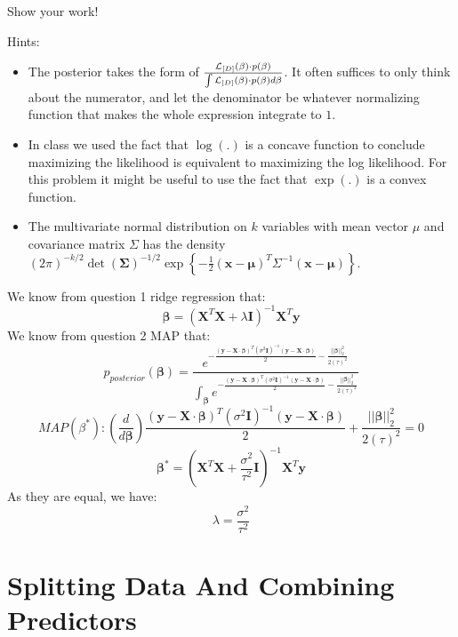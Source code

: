 \documentclass[11pt]{article}
\renewcommand{\vec}[1]{\mathbf{#1}}
\begin{document}
\begin{enumerate}
Show your work!

Hints:
\begin{itemize}
\item The posterior takes the form of
$\frac{
{\cal L}_{[D]}(\vec{\beta}) \cdot p(\vec{\beta})
}{
\int {\cal L}_{[D]}(\vec{\beta}) \cdot p(\vec{\beta})
d \vec{\beta}
}$.  It often suffices to only think about the numerator, and let the denominator be whatever normalizing function that makes the whole expression integrate to $1$.
\item In class we used the fact that $\log(.)$ is a concave function to conclude maximizing the likelihood is equivalent to maximizing the log likelihood.  For this problem it might be useful to use the fact that $\exp(.)$ is a convex function.
\item The multivariate normal distribution on $k$ variables with mean vector $\mu$ and covariance matrix $\Sigma$ has the density
$(2 \pi)^{-k/2} \det(\vec{\Sigma})^{-1/2}\exp \left\{ - \frac{1}{2} (\vec{x} - \vec{\mu})^T \Sigma^{-1} (\vec{x} - \vec{\mu})
 \right\}
$.
\end{itemize}

\begin{answertext}{10cm}{}
We know from question 1 ridge regression that:
$$\vec{\beta} = (\vec{X}^{T}\vec{X} + \lambda\vec{I})^{-1} \vec{X}^{T}\vec{y}$$
We know from question 2 MAP that:
$$p_{posterior}{(\vec{\beta})} = \frac{
e^{-\frac{(\vec y - \vec X \cdot \vec{\beta})^{T}(\sigma^2\vec I)^{-1}(\vec y - \vec X \cdot \vec{\beta})}{2} -\frac{||\vec{\beta}||^{2}_{2}}{2 {(\tau)}^2}}  
}{\int_{\vec{\beta}}
e^{-\frac{(\vec y - \vec X \cdot \vec{\beta})^{T}(\sigma^2\vec I)^{-1}(\vec y - \vec X \cdot \vec{\beta})}{2} -\frac{||\vec{\beta}||^{2}_{2}}{2 {(\tau)}^2}}  
} $$
$$ MAP(\beta^{*}):(\frac{d}{d\vec{\beta}}) \frac{(\vec y - \vec X \cdot \vec{\beta})^{T}(\sigma^2\vec I)^{-1}(\vec y - \vec X \cdot \vec{\beta})}{2} +\frac{||\vec{\beta}||^{2}_{2}}{2 {(\tau)}^2}=0$$
$$\vec{\beta^{*}} = (\vec{X}^{T}\vec{X} + \frac{\sigma^2}{\tau^2}\vec I)^{-1} \vec{X}^{T}\vec{y}$$
As they are equal, we have:
$$\lambda = \frac{\sigma^2}{\tau^2}$$
  
\end{answertext} 

\end{enumerate}

\pagebreak
\section{Splitting Data And Combining Predictors}
\end{document}
